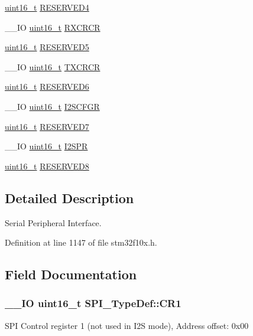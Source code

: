 \begin{DoxyCompactItemize}
\item 
\hyperlink{stdint_8h_a273cf69d639a59973b6019625df33e30}{uint16\-\_\-t} \hyperlink{struct_s_p_i___type_def_a20e3ac1445ed1e7a9792ca492c46a73a}{R\-E\-S\-E\-R\-V\-E\-D4}
\item 
\-\_\-\-\_\-\-I\-O \hyperlink{stdint_8h_a273cf69d639a59973b6019625df33e30}{uint16\-\_\-t} \hyperlink{struct_s_p_i___type_def_ab53da6fb851d911ae0b1166be2cfe48a}{R\-X\-C\-R\-C\-R}
\item 
\hyperlink{stdint_8h_a273cf69d639a59973b6019625df33e30}{uint16\-\_\-t} \hyperlink{struct_s_p_i___type_def_ab63440e38c7872a8ed11fb2d8d94714e}{R\-E\-S\-E\-R\-V\-E\-D5}
\item 
\-\_\-\-\_\-\-I\-O \hyperlink{stdint_8h_a273cf69d639a59973b6019625df33e30}{uint16\-\_\-t} \hyperlink{struct_s_p_i___type_def_a3c0c1be66bc0a1846274a7511f4a36f5}{T\-X\-C\-R\-C\-R}
\item 
\hyperlink{stdint_8h_a273cf69d639a59973b6019625df33e30}{uint16\-\_\-t} \hyperlink{struct_s_p_i___type_def_a0870177921541602a44f744f1b66e823}{R\-E\-S\-E\-R\-V\-E\-D6}
\item 
\-\_\-\-\_\-\-I\-O \hyperlink{stdint_8h_a273cf69d639a59973b6019625df33e30}{uint16\-\_\-t} \hyperlink{struct_s_p_i___type_def_a20a4775ce461eec0d9a437bed464c0a5}{I2\-S\-C\-F\-G\-R}
\item 
\hyperlink{stdint_8h_a273cf69d639a59973b6019625df33e30}{uint16\-\_\-t} \hyperlink{struct_s_p_i___type_def_a98df0a538eb077b2cfc5194eda200f1b}{R\-E\-S\-E\-R\-V\-E\-D7}
\item 
\-\_\-\-\_\-\-I\-O \hyperlink{stdint_8h_a273cf69d639a59973b6019625df33e30}{uint16\-\_\-t} \hyperlink{struct_s_p_i___type_def_aecee11b0d2e534b5243e9db6a0e10026}{I2\-S\-P\-R}
\item 
\hyperlink{stdint_8h_a273cf69d639a59973b6019625df33e30}{uint16\-\_\-t} \hyperlink{struct_s_p_i___type_def_a0ffe762827b71caff20c75bf105387f6}{R\-E\-S\-E\-R\-V\-E\-D8}
\end{DoxyCompactItemize}


\subsection{Detailed Description}
Serial Peripheral Interface. 

Definition at line 1147 of file stm32f10x.\-h.



\subsection{Field Documentation}
\hypertarget{struct_s_p_i___type_def_a1e398155ddd013fcdd41309b4bd0bd5f}{
\subsubsection[{C\-R1}]{\setlength{\rightskip}{0pt plus 5cm}\-\_\-\-\_\-\-I\-O {\bf uint16\-\_\-t} S\-P\-I\-\_\-\-Type\-Def\-::\-C\-R1}}\label{struct_s_p_i___type_def_a1e398155ddd013fcdd41309b4bd0bd5f}
S\-P\-I Control register 1 (not used in I2\-S mode), Address offset\-: 0x00


